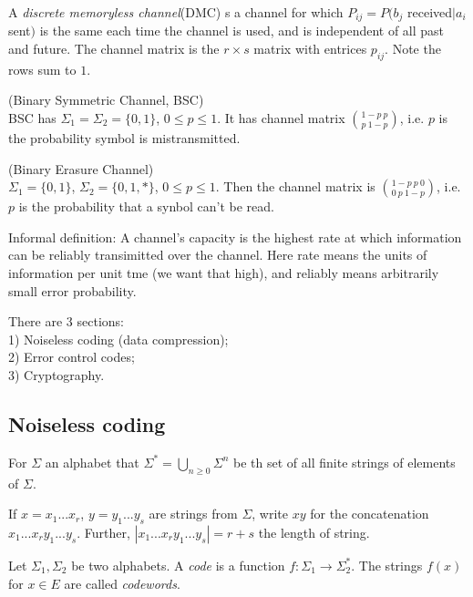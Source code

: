 \documentclass[a4paper]{article}
\begin{document}
\begin{defi}
A \emph{discrete memoryless channel}(DMC) s a channel for which $P_{ij} = P(b_j$ received$|a_i$ sent$)$ is the same each time the channel is used, and is independent of all past and future. The channel matrix is the $r \times s$ matrix with entrices $p_{ij}$. Note the rows sum to $1$.
\end{defi}

\begin{eg} (Binary Symmetric Channel, BSC)\\
BSC has $\Sigma_1 = \Sigma_2 = \{0,1\}$, $0 \leq p \leq 1$. It has channel matrix ${{1-p \ p} \choose {p \ 1-p}}$, i.e. $p$ is the probability symbol is mistransmitted.
\end{eg}

\begin{eg} (Binary Erasure Channel)\\
$\Sigma_1 = \{0,1\}$, $\Sigma_2 = \{0,1,*\}$, $0 \leq p \leq 1$. Then the channel matrix is ${{1-p \ p \ 0} \choose {0 \ p \ 1-p}}$, i.e. $p$ is the probability that a synbol can't be read.
\end{eg}

Informal definition: A channel's capacity is the highest rate at which information can be reliably transimitted over the channel. Here rate means the units of information per unit tme (we want that high), and reliably means arbitrarily small error probability.

There are 3 sections:\\
1) Noiseless coding (data compression);\\
2) Error control codes;\\
3) Cryptography.

\subsection{Noiseless coding}
\begin{notation}
For $\Sigma$ an alphabet that $\Sigma^* = \bigcup_{n \geq 0} \Sigma^n$ be th set of all finite strings of elements of $\Sigma$.
\end{notation}

If $x=x_1...x_r$, $y=y_1...y_s$ are strings from $\Sigma$, write $xy$ for the concatenation $x_1...x_ry_1...y_s$. Further, $|x_1...x_ry_1...y_s| = r+s$ the length of string.

\begin{defi}
Let $\Sigma_1,\Sigma_2$ be two alphabets. A \emph{code} is a function $f:\Sigma_1 \to \Sigma_2^*$. The strings $f(x)$ for $x \in E$ are called \emph{codewords}.
\end{defi}
\end{document}
